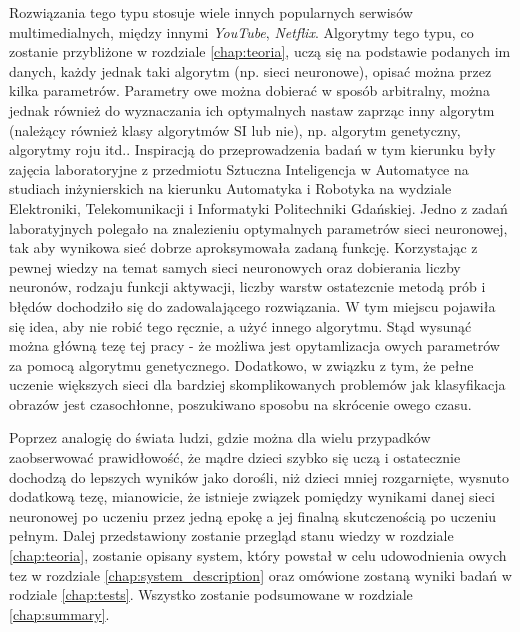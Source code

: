Rozwiązania tego typu stosuje wiele innych popularnych serwisów multimedialnych, między innymi \textit{YouTube}, \textit{Netflix}.
Algorytmy tego typu, co zostanie przybliżone w rozdziale \ref{chap:teoria}, uczą się na podstawie podanych im danych, każdy jednak taki algorytm (np. sieci neuronowe), opisać można przez kilka parametrów.
Parametry owe można dobierać w sposób arbitralny, można jednak również do wyznaczania ich optymalnych nastaw zaprząc inny algorytm (należący również klasy algorytmów SI lub nie), np. algorytm genetyczny, algorytmy roju itd..
Inspiracją do przeprowadzenia badań w tym kierunku były zajęcia laboratoryjne z przedmiotu Sztuczna Inteligencja w Automatyce na studiach inżynierskich na kierunku Automatyka i Robotyka na wydziale Elektroniki, Telekomunikacji i Informatyki Politechniki Gdańskiej.
Jedno z zadań laboratyjnych polegało na znalezieniu optymalnych parametrów sieci neuronowej, tak aby wynikowa sieć dobrze aproksymowała zadaną funkcję.
Korzystając z pewnej wiedzy na temat samych sieci neuronowych oraz dobierania liczby neuronów, rodzaju funkcji aktywacji, liczby warstw ostatezcnie metodą prób i błędów dochodziło się do zadowalającego rozwiązania.
W tym miejscu pojawiła się idea, aby nie robić tego ręcznie, a użyć innego algorytmu.
Stąd wysunąć można główną tezę tej pracy - że możliwa jest opytamlizacja owych parametrów za pomocą algorytmu genetycznego.
Dodatkowo, w związku z tym, że pełne uczenie większych sieci dla bardziej skomplikowanych problemów jak klasyfikacja obrazów jest czasochłonne, poszukiwano sposobu na skrócenie owego czasu.

Poprzez analogię do świata ludzi, gdzie można dla wielu przypadków zaobserwować prawidłowość, że mądre dzieci szybko się uczą i ostatecznie dochodzą do lepszych wyników jako dorośli, niż dzieci mniej rozgarnięte, wysnuto dodatkową tezę, mianowicie, że istnieje związek pomiędzy wynikami danej sieci neuronowej po uczeniu przez jedną epokę a jej finalną skutczenością po uczeniu pełnym.
Dalej przedstawiony zostanie przegląd stanu wiedzy w rozdziale \ref{chap:teoria}, zostanie opisany system, który powstał w celu udowodnienia owych tez w rozdziale \ref{chap:system_description} oraz omówione zostaną wyniki badań w rodziale \ref{chap:tests}.
Wszystko zostanie podsumowane w rozdziale \ref{chap:summary}.
